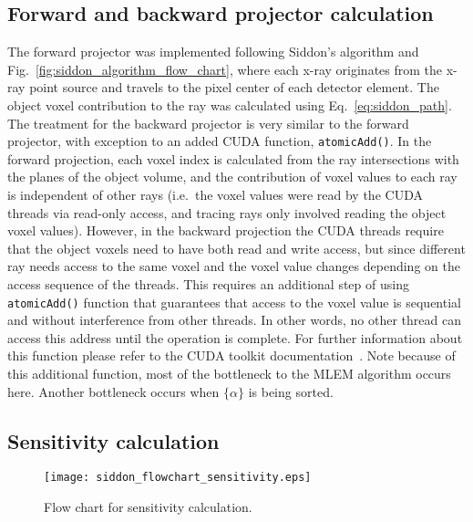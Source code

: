 \subsection{Forward and backward projector calculation}
The forward projector was implemented following Siddon's algorithm and Fig.~\ref{fig:siddon_algorithm_flow_chart}, where each x-ray originates from the x-ray point source and travels to the pixel center of each detector element.  The object voxel contribution to the ray was calculated using Eq.~\ref{eq:siddon_path}.  The treatment for the backward projector is very similar to the forward projector, with exception to an added CUDA function, \texttt{atomicAdd()}.  In the forward projection, each voxel index is calculated from the ray intersections with the planes of the object volume, and the contribution of voxel values to each ray is independent of other rays (i.e.\ the voxel values were read by the CUDA threads via read-only access, and tracing rays only involved reading the object voxel values).  However, in the backward projection the CUDA threads require that the object voxels need to have both read and write access, but since different ray needs access to the same voxel and the voxel value changes depending on the access sequence of the threads.  This requires an additional step of using \texttt{atomicAdd()} function that guarantees that access to the voxel value is sequential and without interference from other threads.  In other words, no other thread can access this address until the operation is complete.  For further information about this function please refer to the CUDA toolkit documentation~\cite{Cudatoolkit}.  Note because of this additional function, most of the bottleneck to the MLEM algorithm occurs here.  Another bottleneck occurs when $\{ \alpha \}$ is being sorted.

\subsection{Sensitivity calculation}

\begin{figure}[h]
\centering
\texttt{[image: siddon\_flowchart\_sensitivity.eps]}
\caption{Flow chart for sensitivity calculation.}
\label{fig:sensitivityslices}
\end{figure}

